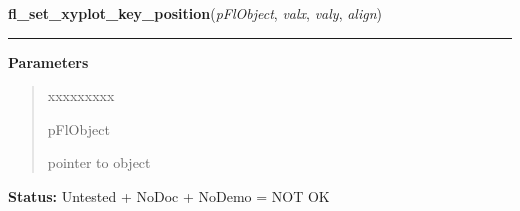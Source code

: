     \label{xformslib:flxyplot:fl_set_xyplot_key_position}

    \vspace{0.5ex}

\hspace{.8\funcindent}\begin{boxedminipage}{\funcwidth}

    \raggedright \textbf{fl\_set\_xyplot\_key\_position}(\textit{pFlObject}, \textit{valx}, \textit{valy}, \textit{align})

    \vspace{-1.5ex}

    \rule{\textwidth}{0.5\fboxrule}
\setlength{\parskip}{2ex}
\setlength{\parskip}{1ex}
      \textbf{Parameters}
      \vspace{-1ex}

      \begin{quote}
        \begin{Ventry}{xxxxxxxxx}

          \item[pFlObject]

          pointer to object

        \end{Ventry}

      \end{quote}

\textbf{Status:} Untested + NoDoc + NoDemo = NOT OK



    \end{boxedminipage}

    \label{xformslib:flxyplot:fl_set_xyplot_key_font}

    \vspace{0.5ex}

